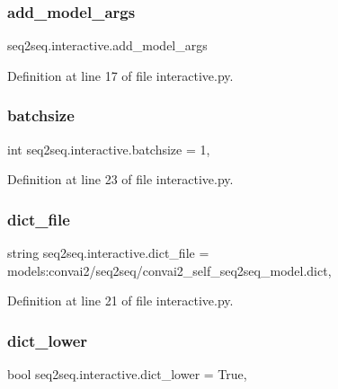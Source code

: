 \subsubsection{\texorpdfstring{add\+\_\+model\+\_\+args}{add\_model\_args}}
{\footnotesize\ttfamily seq2seq.\+interactive.\+add\+\_\+model\+\_\+args}



Definition at line 17 of file interactive.\+py.

\mbox{\label{namespaceseq2seq_1_1interactive_abe753d056cab714a7dad5ee5d69be232}} 
\subsubsection{\texorpdfstring{batchsize}{batchsize}}
{\footnotesize\ttfamily int seq2seq.\+interactive.\+batchsize = 1,}



Definition at line 23 of file interactive.\+py.

\mbox{\label{namespaceseq2seq_1_1interactive_aa4f3ad0ec703a257baf585773e2e1d7a}} 
\subsubsection{\texorpdfstring{dict\+\_\+file}{dict\_file}}
{\footnotesize\ttfamily string seq2seq.\+interactive.\+dict\+\_\+file = \textquotesingle{}models\+:convai2/seq2seq/convai2\+\_\+self\+\_\+seq2seq\+\_\+model.\+dict\textquotesingle{},}



Definition at line 21 of file interactive.\+py.

\mbox{\label{namespaceseq2seq_1_1interactive_a895b98f538fc182cbfe772e10ddb79ff}} 
\subsubsection{\texorpdfstring{dict\+\_\+lower}{dict\_lower}}
{\footnotesize\ttfamily bool seq2seq.\+interactive.\+dict\+\_\+lower = True,}



